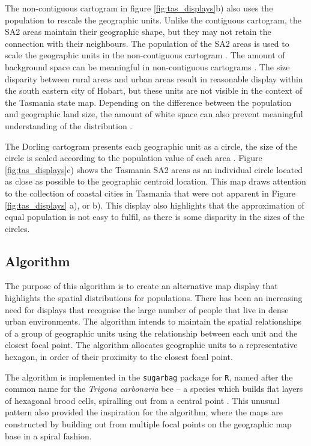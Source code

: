The non-contiguous cartogram in figure \ref{fig:tas_displays}b) also
uses the population to rescale the geographic units. Unlike the
contiguous cartogram, the SA2 areas maintain their geographic shape, but
they may not retain the connection with their neighbours. The population
of the SA2 areas is used to scale the geographic units in the
non-contiguous cartogram \citep{NAC}. The amount of background space can
be meaningful in non-contiguous cartograms \citep{ECGC}. The size
disparity between rural areas and urban areas result in reasonable
display within the south eastern city of Hobart, but these units are not
visible in the context of the Tasmania state map. Depending on the
difference between the population and geographic land size, the amount
of white space can also prevent meaningful understanding of the
distribution \citep{TVSSS}.

The Dorling cartogram presents each geographic unit as a circle, the
size of the circle is scaled according to the population value of each
area \citep{ACTUC}. Figure \ref{fig:tas_displays}c) shows the Tasmania
SA2 areas as an individual circle located as close as possible to the
geographic centroid location. This map draws attention to the collection
of coastal cities in Tasmania that were not apparent in Figure
\ref{fig:tas_displays} a), or b). This display also highlights that the
approximation of equal population is not easy to fulfil, as there is
some disparity in the sizes of the circles.

\hypertarget{algorithm}{%
\subsection{Algorithm}\label{algorithm}}

The purpose of this algorithm is to create an alternative map display
that highlights the spatial distributions for populations. There has
been an increasing need for displays that recognise the large number of
people that live in dense urban environments. The algorithm intends to
maintain the spatial relationships of a group of geographic units using
the relationship between each unit and the closest focal point. The
algorithm allocates geographic units to a representative hexagon, in
order of their proximity to the closest focal point.

The algorithm is implemented in the \texttt{sugarbag} package for
\texttt{R}, named after the common name for the \emph{Trigona
carbonaria} bee -- a species which builds flat layers of hexagonal brood
cells, spiralling out from a central point \citep{PH}. This unusual
pattern also provided the inspiration for the algorithm, where the maps
are constructed by building out from multiple focal points on the
geographic map base in a spiral fashion.

